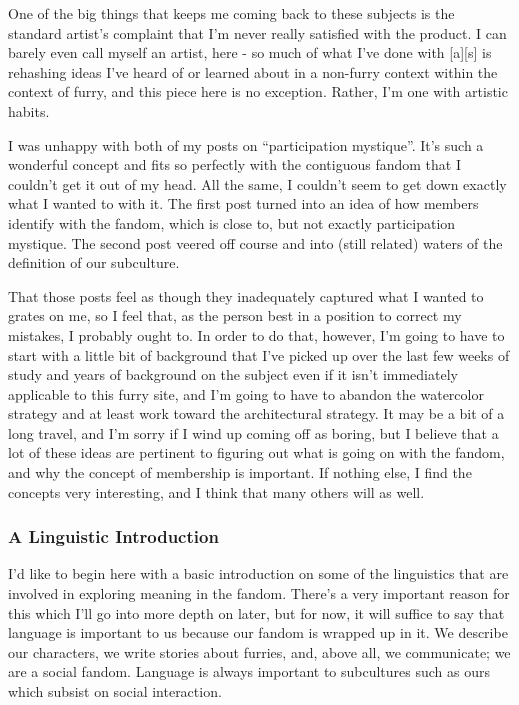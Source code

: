 One of the big things that keeps me coming back to these subjects is the
standard artist's complaint that I'm never really satisfied with the
product. I can barely even call myself an artist, here - so much of what
I've done with {[}a{]}{[}s{]} is rehashing ideas I've heard of or
learned about in a non-furry context within the context of furry, and
this piece here is no exception. Rather, I'm one with artistic habits.

I was unhappy with both of my posts on ``participation mystique''. It's
such a wonderful concept and fits so perfectly with the contiguous
fandom that I couldn't get it out of my head. All the same, I couldn't
seem to get down exactly what I wanted to with it. The first post turned
into an idea of how members identify with the fandom, which is close to,
but not exactly participation mystique. The second post veered off
course and into (still related) waters of the definition of our
subculture.

That those posts feel as though they inadequately captured what I wanted
to grates on me, so I feel that, as the person best in a position to
correct my mistakes, I probably ought to. In order to do that, however,
I'm going to have to start with a little bit of background that I've
picked up over the last few weeks of study and years of background on
the subject even if it isn't immediately applicable to this furry site,
and I'm going to have to abandon the watercolor strategy and at least
work toward the architectural strategy. It may be a bit of a long
travel, and I'm sorry if I wind up coming off as boring, but I believe
that a lot of these ideas are pertinent to figuring out what is going on
with the fandom, and why the concept of membership is important. If
nothing else, I find the concepts very interesting, and I think that
many others will as well.

\subsubsection{A Linguistic
Introduction}\label{a-linguistic-introduction}

I'd like to begin here with a basic introduction on some of the
linguistics that are involved in exploring meaning in the fandom.
There's a very important reason for this which I'll go into more depth
on later, but for now, it will suffice to say that language is important
to us because our fandom is wrapped up in it. We describe our
characters, we write stories about furries, and, above all, we
communicate; we are a social fandom. Language is always important to
subcultures such as ours which subsist on social interaction.

